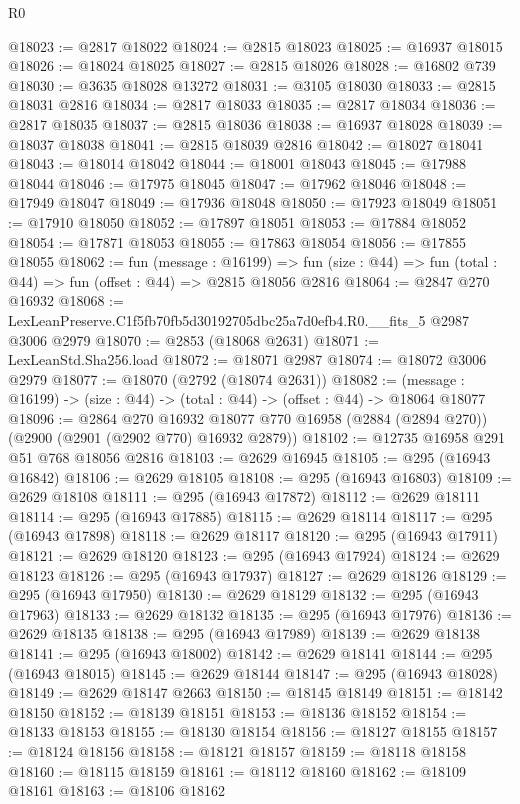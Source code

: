 \begin{lexlean}{R0}
\begin{coremodule}
@18023 := @2817 @18022
@18024 := @2815 @18023
@18025 := @16937 @18015
@18026 := @18024 @18025
@18027 := @2815 @18026
@18028 := @16802 @739
@18030 := @3635 @18028 @13272
@18031 := @3105 @18030
@18033 := @2815 @18031 @2816
@18034 := @2817 @18033
@18035 := @2817 @18034
@18036 := @2817 @18035
@18037 := @2815 @18036
@18038 := @16937 @18028
@18039 := @18037 @18038
@18041 := @2815 @18039 @2816
@18042 := @18027 @18041
@18043 := @18014 @18042
@18044 := @18001 @18043
@18045 := @17988 @18044
@18046 := @17975 @18045
@18047 := @17962 @18046
@18048 := @17949 @18047
@18049 := @17936 @18048
@18050 := @17923 @18049
@18051 := @17910 @18050
@18052 := @17897 @18051
@18053 := @17884 @18052
@18054 := @17871 @18053
@18055 := @17863 @18054
@18056 := @17855 @18055
@18062 := fun (message : @16199) =>
  fun (size : @44) => fun (total : @44) => fun (offset : @44) => @2815 @18056 @2816
@18064 := @2847 @270 @16932
@18068 := LexLeanPreserve.C1f5fb70fb5d30192705dbc25a7d0efb4.R0.__fits_5 @2987 @3006 @2979
@18070 := @2853 (@18068 @2631)
@18071 := LexLeanStd.Sha256.load
@18072 := @18071 @2987
@18074 := @18072 @3006 @2979
@18077 := @18070 (@2792 (@18074 @2631))
@18082 := (message : @16199) -> (size : @44) -> (total : @44) -> (offset : @44) -> @18064 @18077
@18096 := @2864
    @270
    @16932
    @18077
    @770
    @16958
    (@2884 (@2894 @270))
    (@2900 (@2901 (@2902 @770) @16932 @2879))
@18102 := @12735 @16958 @291 @51 @768 @18056 @2816
@18103 := @2629 @16945
@18105 := @295 (@16943 @16842)
@18106 := @2629 @18105
@18108 := @295 (@16943 @16803)
@18109 := @2629 @18108
@18111 := @295 (@16943 @17872)
@18112 := @2629 @18111
@18114 := @295 (@16943 @17885)
@18115 := @2629 @18114
@18117 := @295 (@16943 @17898)
@18118 := @2629 @18117
@18120 := @295 (@16943 @17911)
@18121 := @2629 @18120
@18123 := @295 (@16943 @17924)
@18124 := @2629 @18123
@18126 := @295 (@16943 @17937)
@18127 := @2629 @18126
@18129 := @295 (@16943 @17950)
@18130 := @2629 @18129
@18132 := @295 (@16943 @17963)
@18133 := @2629 @18132
@18135 := @295 (@16943 @17976)
@18136 := @2629 @18135
@18138 := @295 (@16943 @17989)
@18139 := @2629 @18138
@18141 := @295 (@16943 @18002)
@18142 := @2629 @18141
@18144 := @295 (@16943 @18015)
@18145 := @2629 @18144
@18147 := @295 (@16943 @18028)
@18149 := @2629 @18147 @2663
@18150 := @18145 @18149
@18151 := @18142 @18150
@18152 := @18139 @18151
@18153 := @18136 @18152
@18154 := @18133 @18153
@18155 := @18130 @18154
@18156 := @18127 @18155
@18157 := @18124 @18156
@18158 := @18121 @18157
@18159 := @18118 @18158
@18160 := @18115 @18159
@18161 := @18112 @18160
@18162 := @18109 @18161
@18163 := @18106 @18162

\end{coremodule}
\end{lexlean}
